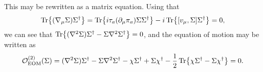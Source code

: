 This may be rewritten as a matrix equation. 
Using that 
\begin{align*}
    \Tr{(\nabla_\mu \Sigma)\Sigma^\dagger}
    = 
    \Tr{i \tau_a (\partial_\mu \pi_a )\Sigma \Sigma^\dagger}
    - i\Tr{[v_\mu, \Sigma]\Sigma^\dagger}
    = 0,
\end{align*}
we can see that $\Tr{(\nabla^2 \Sigma)\Sigma^\dagger - \Sigma \nabla^2 \Sigma^\dagger} = 0$, and the equation of motion may be written as
\begin{equation}
    \label{EOM matrix form}
    \mathcal{O}_\mathrm{EOM}^{(2)}(\Sigma) 
    = 
    (\nabla^2 \Sigma)\Sigma^\dagger
    - \Sigma \nabla^2 \Sigma^\dagger
    - \chi \Sigma^\dagger
    + \Sigma \chi^\dagger
    - \frac{1}{2}
    \Tr{ \chi \Sigma^\dagger - \Sigma \chi^\dagger} = 0.
\end{equation}

